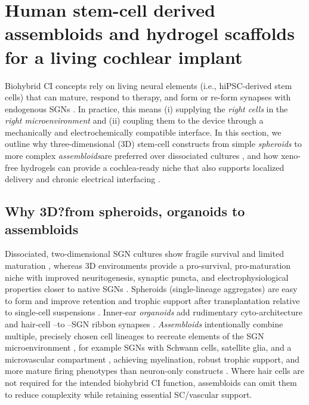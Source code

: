 \documentclass[referee,pdflatex, sn-vancouver-num]{sn-jnl}%
\theoremstyle{thmstyleone}%
\theoremstyle{thmstyletwo}%
\theoremstyle{thmstylethree}%
\DeclareRobustCommand{\textendash}{\ifmmode\text{-}\else\leavevmode\hbox{--}\fi}
\begin{document}
\section{Human stem-cell derived assembloids and hydrogel scaffolds for a living cochlear implant}\label{sec4}\label{stem_cells}
Biohybrid CI concepts rely on living neural elements (i.e., hiPSC-derived stem cells) that can mature, respond to therapy, and form or re-form synapses with endogenous SGNs \cite{Nella2022NeurotrophinGradients}. In practice, this means (i) supplying the \emph{right cells} in the \emph{right microenvironment} and (ii) coupling them to the device through a mechanically and electrochemically compatible interface. In this section, we outline why three-dimensional (3D) stem-cell constructs \textemdash from simple \emph{spheroids} to more complex \emph{assembloids}\textemdash are preferred over dissociated cultures \cite{Pasca2022}, and how xeno-free hydrogels can provide a cochlea-ready niche that also supports localized delivery and chronic electrical interfacing .

\subsection{Why 3D?\textemdash from spheroids, organoids to assembloids}
Dissociated, two-dimensional SGN cultures show fragile survival and limited maturation \cite{Corrales2006}, whereas 3D environments provide a pro-survival, pro-maturation niche with improved neuritogenesis, synaptic puncta, and electrophysiological properties closer to native SGNs \cite{Zine2021StemCells,Sun2023CellProlif,Koehler2017NatBiotech}. Spheroids (single-lineage aggregates) are easy to form and improve retention and trophic support after transplantation relative to single-cell suspensions \cite{Chang2020ActaBiomaterialia}. Inner-ear \emph{organoids} add rudimentary cyto-architecture and hair-cell \textendash to \textendash SGN ribbon synapses \cite{Koehler2013Nature,Koehler2017NatBiotech,Sun2023CellProlif}. \emph{Assembloids} intentionally combine multiple, precisely chosen cell lineages to recreate elements of the SGN microenvironment \textemdash, for example SGNs with Schwann cells, satellite glia, and a microvascular compartment \textemdash, achieving myelination, robust trophic support, and more mature firing phenotypes than neuron-only constructs \cite{Xia2023StemCellReports,Oliveira2023FrontiersPN}. Where hair cells are not required for the intended biohybrid CI function, assembloids can omit them to reduce complexity while retaining essential SC/vascular support.
\end{document}
